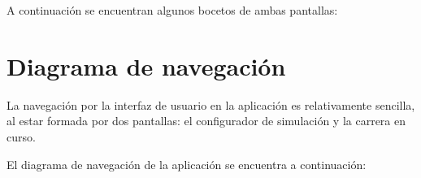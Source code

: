 \bigskip

A continuación se encuentran algunos bocetos de ambas pantallas:


\section{Diagrama de navegación}

La navegación por la interfaz de usuario en la aplicación es relativamente sencilla, al estar formada por dos pantallas: el configurador de simulación y la carrera en curso.

\bigskip

El diagrama de navegación de la aplicación se encuentra a continuación:

